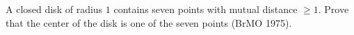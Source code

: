 A closed disk of radius $1$ contains seven points with mutual distance $\geq 1$. Prove that the center of the disk is one of the seven points (BrMO 1975).
